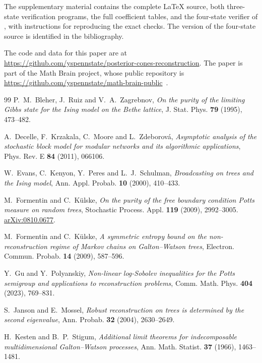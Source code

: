 \documentclass[11pt,reqno]{amsart}
\theoremstyle{definition}
\theoremstyle{remark}
\begin{document}
The supplementary material contains the complete \LaTeX{} source, both three-state verification programs, the full coefficient tables, and the four-state verifier of \cite{OpenAI4}, with instructions for reproducing the exact checks. The version of the four-state source is identified in the bibliography.

The code and data for this paper are at \url{https://github.com/yspennstate/posterior-cones-reconstruction}. The paper is part of the Math Brain project, whose public repository is \url{https://github.com/yspennstate/math-brain-public}~\cite{MathBrainRepo}.

\begin{thebibliography}{99}
P.~M.~Bleher, J.~Ruiz and V.~A.~Zagrebnov, \emph{On the purity of the limiting Gibbs state for the Ising model on the Bethe lattice}, J. Stat. Phys. \textbf{79} (1995), 473--482.

A.~Decelle, F.~Krzakala, C.~Moore and L.~Zdeborov\'a, \emph{Asymptotic analysis of the stochastic block model for modular networks and its algorithmic applications}, Phys. Rev. E \textbf{84} (2011), 066106.

W.~Evans, C.~Kenyon, Y.~Peres and L.~J.~Schulman, \emph{Broadcasting on trees and the Ising model}, Ann. Appl. Probab. \textbf{10} (2000), 410--433.

M.~Formentin and C.~K\"ulske, \emph{On the purity of the free boundary condition Potts measure on random trees}, Stochastic Process. Appl. \textbf{119} (2009), 2992--3005. \href{https://arxiv.org/abs/0810.0677}{arXiv:0810.0677}.

M.~Formentin and C.~K\"ulske, \emph{A symmetric entropy bound on the non-reconstruction regime of Markov chains on Galton--Watson trees}, Electron. Commun. Probab. \textbf{14} (2009), 587--596.

Y.~Gu and Y.~Polyanskiy, \emph{Non-linear log-Sobolev inequalities for the Potts semigroup and applications to reconstruction problems}, Comm. Math. Phys. \textbf{404} (2023), 769--831.

S.~Janson and E.~Mossel, \emph{Robust reconstruction on trees is determined by the second eigenvalue}, Ann. Probab. \textbf{32} (2004), 2630--2649.

H.~Kesten and B.~P.~Stigum, \emph{Additional limit theorems for indecomposable multidimensional Galton--Watson processes}, Ann. Math. Statist. \textbf{37} (1966), 1463--1481.


\end{thebibliography}
\end{document}
